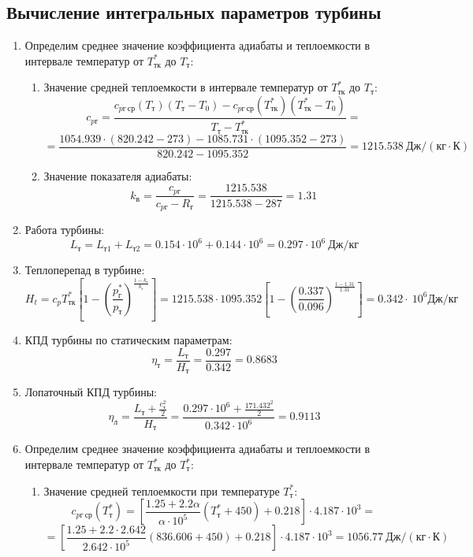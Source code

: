 \documentclass[a4paper,10pt]{article}
\begin{document}
\subsection{Вычисление интегральных параметров турбины}
\begin{enumerate}

\item Определим среднее значение коэффициента адиабаты и теплоемкости в интервале температур от $T_{тк}^*$ до $T_т$:
	\begin{enumerate}
	
	\item Значение средней теплоемкости в интервале температур от $T_{тк}^*$ до $T_{т}$:
	\[c_{pг} = \frac{
	c_{pг\ ср}(T_{т}) (T_{т} - T_0) - c_{pг\ ср}(T_{тк}^*)(T_{тк}^* - T_0)
	}{
	T_{т} - T_{тк}^*} = \]
	\[=\frac{
	1054.939 \cdot (820.242 - 273) - 1085.731 \cdot (1095.352 - 273)
	}{
	820.242 - 1095.352} = 1215.538\ Дж / (кг \cdot К)\]
	\item Значение показателя адиабаты:
	\[k_в = \frac{c_{pг}}{c_{pг} - R_г} = \frac{1215.538}{1215.538 - 287} = 1.31\]
	\end{enumerate}

\item Работа турбины:
\[L_т = L_{т1} + L_{т2} = 0.154 \cdot 10^6 + 0.144 \cdot 10^6 = 0.297\cdot 10^6\ Дж/кг\]
\item Теплоперепад в турбине:
\[H_t = c_p T_{тк}^* \left[
	1 - \left(
	\frac{p_г^*}{p_т} \right) ^ {\frac{1 - k_г}{k_г}}
	\right] = 
	1215.538 \cdot 1095.352 \left[
	1 - \left(
	\frac{0.337}{0.096} \right) ^ {\frac{1 - 1.31}{1.31}}
	\right] = 0.342 \cdot\ 10^6 Дж/кг\]
\item КПД турбины по статическим параметрам:
\[\eta_т = \frac{L_т}{H_т} = \frac{0.297}{0.342} = 0.8683\]
\item Лопаточный КПД турбины:
\[\eta_л = \frac{L_т + \frac{c_т^2}{2}}{H_т} = \frac{0.297 \cdot 10^6 + \frac{171.432^2}{2}}{0.342 \cdot 10^6} = 0.9113\]

\item Определим среднее значение коэффициента адиабаты и теплоемкости в интервале температур от $T_{тк}^*$ до $T_т^*$:
	\begin{enumerate}
	\item Значение средней теплоемкости при температуре $T_{т}^*$:
	\[c_{pг\ ср}(T_т^*) = \left[ 
	\frac{1.25 +2.2 \alpha}{\alpha \cdot 10^5} (T_{т}^* + 450) + 0.218
	\right] \cdot 4.187 \cdot 10^3= \]
	\[=\left[ 
	\frac{1.25 +2.2 \cdot 2.642}{2.642 \cdot 10^5} (836.606 + 450) + 0.218
	\right] \cdot 4.187 \cdot 10^3= 1056.77\ Дж / (кг \cdot К) \]
	

\end{enumerate}
\end{enumerate}
\end{document}
